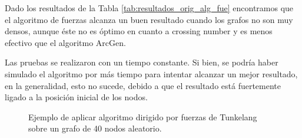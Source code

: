 Dado los resultados de la Tabla \ref{tab:resultados_orig_alg_fue} encontramos que el algoritmo de fuerzas alcanza un buen resultado cuando los grafos no son muy densos, aunque éste no es óptimo en cuanto a crossing number y es menos efectivo que el algoritmo ArcGen. 

Las pruebas se realizaron con un tiempo constante.  Si bien, se podría haber simulado el algoritmo por más tiempo para intentar alcanzar un mejor resultado,   en la generalidad, esto no sucede, debido a que el resultado está fuertemente ligado a la posición inicial de los nodos.

\begin{figure}
	\centering
	\caption{Ejemplo de aplicar algoritmo dirigido por fuerzas de Tunkelang sobre un grafo de 40 nodos aleatorio.}
	\label{fig:resultado_ejemplo_grafo_ori_fue}
\end{figure}

